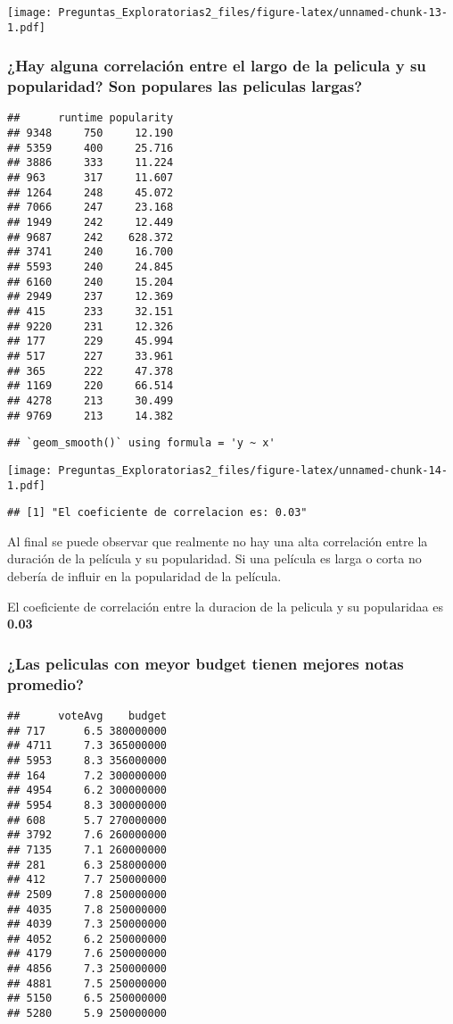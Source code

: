 \documentclass[
]{article}
\begin{document}
\texttt{[image: Preguntas\_Exploratorias2\_files/figure-latex/unnamed-chunk-13-1.pdf]}

\subsubsection{¿Hay alguna correlación entre el largo de la pelicula y
su popularidad? Son populares las peliculas
largas?}\label{hay-alguna-correlaciuxf3n-entre-el-largo-de-la-pelicula-y-su-popularidad-son-populares-las-peliculas-largas}

\begin{verbatim}
##      runtime popularity
## 9348     750     12.190
## 5359     400     25.716
## 3886     333     11.224
## 963      317     11.607
## 1264     248     45.072
## 7066     247     23.168
## 1949     242     12.449
## 9687     242    628.372
## 3741     240     16.700
## 5593     240     24.845
## 6160     240     15.204
## 2949     237     12.369
## 415      233     32.151
## 9220     231     12.326
## 177      229     45.994
## 517      227     33.961
## 365      222     47.378
## 1169     220     66.514
## 4278     213     30.499
## 9769     213     14.382
\end{verbatim}

\begin{verbatim}
## `geom_smooth()` using formula = 'y ~ x'
\end{verbatim}

\texttt{[image: Preguntas\_Exploratorias2\_files/figure-latex/unnamed-chunk-14-1.pdf]}

\begin{verbatim}
## [1] "El coeficiente de correlacion es: 0.03"
\end{verbatim}

Al final se puede observar que realmente no hay una alta correlación
entre la duración de la película y su popularidad. Si una película es
larga o corta no debería de influir en la popularidad de la película.

El coeficiente de correlación entre la duracion de la pelicula y su
popularidaa es \textbf{0.03}

\subsubsection{¿Las peliculas con meyor budget tienen mejores notas
promedio?}\label{las-peliculas-con-meyor-budget-tienen-mejores-notas-promedio}

\begin{verbatim}
##      voteAvg    budget
## 717      6.5 380000000
## 4711     7.3 365000000
## 5953     8.3 356000000
## 164      7.2 300000000
## 4954     6.2 300000000
## 5954     8.3 300000000
## 608      5.7 270000000
## 3792     7.6 260000000
## 7135     7.1 260000000
## 281      6.3 258000000
## 412      7.7 250000000
## 2509     7.8 250000000
## 4035     7.8 250000000
## 4039     7.3 250000000
## 4052     6.2 250000000
## 4179     7.6 250000000
## 4856     7.3 250000000
## 4881     7.5 250000000
## 5150     6.5 250000000
## 5280     5.9 250000000
\end{verbatim}
\end{document}
